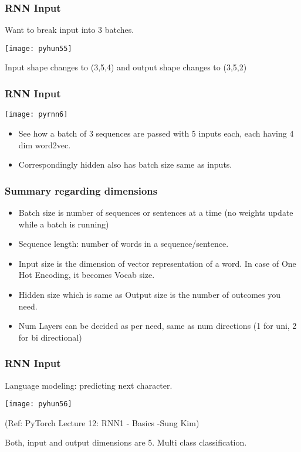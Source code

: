 \begin{frame}[fragile] \frametitle{RNN Input}

Want to break input into 3 batches.

\begin{center}
\texttt{[image: pyhun55]}
\end{center}
Input shape changes to (3,5,4) and output shape changes to (3,5,2)
\end{frame}

\begin{frame}[fragile] \frametitle{RNN Input}

\begin{center}
\texttt{[image: pyrnn6]}
\end{center}
\begin{itemize}
\item See how a batch of 3 sequences are passed with 5 inputs each, each having 4 dim word2vec.
\item Correspondingly hidden also has batch size same as inputs.
\end{itemize}
\end{frame}

\begin{frame}[fragile] \frametitle{Summary regarding dimensions}


\begin{itemize}
\item Batch size is number of sequences or sentences at a time (no weights update while a batch is running)
\item Sequence length: number of words in a sequence/sentence.
\item Input size is the dimension of vector representation of a word. In case of One Hot Encoding, it becomes Vocab size.
\item Hidden size which is same as Output size is the number of outcomes you need.
\item Num Layers can be decided as per need, same as num directions (1 for uni, 2 for bi directional)
\end{itemize}
\end{frame}




\begin{frame}[fragile] \frametitle{RNN Input}

Language modeling: predicting next character.

\begin{center}
\texttt{[image: pyhun56]}

\tiny{(Ref: PyTorch Lecture 12: RNN1 - Basics -Sung Kim)}
\end{center}
Both, input and output dimensions are 5. Multi class classification.
\end{frame}

